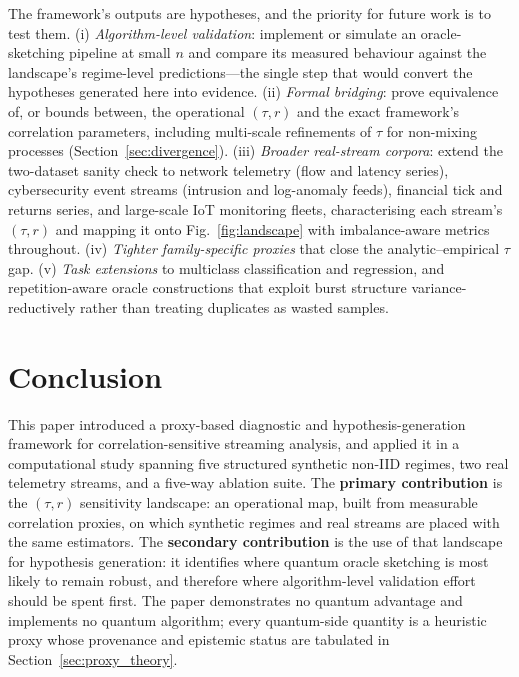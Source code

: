 \documentclass[sensors,article,submit,pdftex,moreauthors]{Definitions/mdpi}
\begin{document}
The framework's outputs are hypotheses, and the priority for future work is to test them. (i) \emph{Algorithm-level validation}: implement or simulate an oracle-sketching pipeline at small $n$ and compare its measured behaviour against the landscape's regime-level predictions---the single step that would convert the hypotheses generated here into evidence. (ii) \emph{Formal bridging}: prove equivalence of, or bounds between, the operational $(\tau, r)$ and the exact framework's correlation parameters, including multi-scale refinements of $\tau$ for non-mixing processes (Section~\ref{sec:divergence}). (iii) \emph{Broader real-stream corpora}: extend the two-dataset sanity check to network telemetry (flow and latency series), cybersecurity event streams (intrusion and log-anomaly feeds), financial tick and returns series, and large-scale IoT monitoring fleets, characterising each stream's $(\tau, r)$ and mapping it onto Fig.~\ref{fig:landscape} with imbalance-aware metrics throughout. (iv) \emph{Tighter family-specific proxies} that close the analytic--empirical $\tau$ gap. (v) \emph{Task extensions} to multiclass classification and regression, and repetition-aware oracle constructions that exploit burst structure variance-reductively rather than treating duplicates as wasted samples.


\section{Conclusion}
\label{sec:conclusion}

This paper introduced a proxy-based diagnostic and hypothesis-generation framework for correlation-sensitive streaming analysis, and applied it in a computational study spanning five structured synthetic non\nobreakdash-IID regimes, two real telemetry streams, and a five-way ablation suite. The \textbf{primary contribution} is the $(\tau, r)$ sensitivity landscape: an operational map, built from measurable correlation proxies, on which synthetic regimes and real streams are placed with the same estimators. The \textbf{secondary contribution} is the use of that landscape for hypothesis generation: it identifies where quantum oracle sketching is most likely to remain robust, and therefore where algorithm-level validation effort should be spent first. The paper demonstrates no quantum advantage and implements no quantum algorithm; every quantum-side quantity is a heuristic proxy whose provenance and epistemic status are tabulated in Section~\ref{sec:proxy_theory}.
\end{document}
